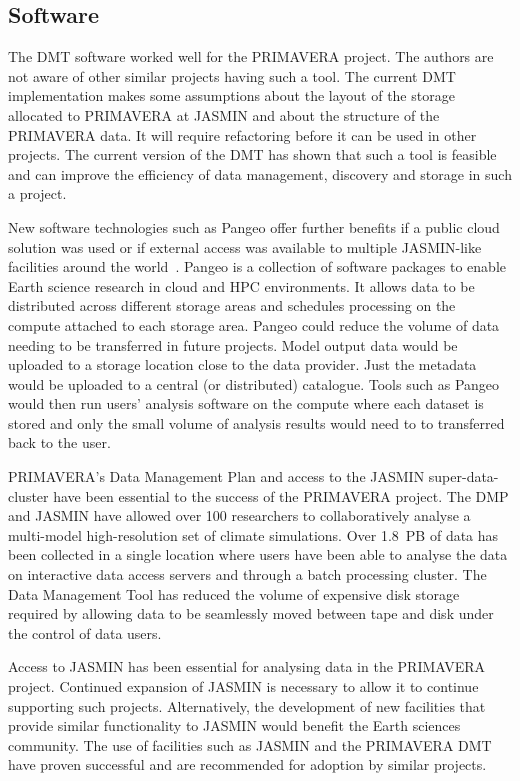 \documentclass[gmd, manuscript]{copernicus}
\begin{document}
\subsection{Software}

The DMT software worked well for the PRIMAVERA project. The authors are not aware of other similar projects having such a tool. The current DMT implementation makes some assumptions about the layout of the storage allocated to PRIMAVERA at JASMIN and about the structure of the PRIMAVERA data. It will require refactoring before it can be used in other projects. The current version of the DMT has shown that such a tool is feasible and can improve the efficiency of data management, discovery and storage in such a project.

New software technologies such as Pangeo offer further benefits if a public cloud solution was used or if external access was available to multiple JASMIN-like facilities around the world~\citep{Pangeo}. Pangeo is a collection of software packages to enable Earth science research in cloud and HPC environments. It allows data to be distributed across different storage areas and schedules processing on the compute attached to each storage area. Pangeo could reduce the volume of data needing to be transferred in future projects. Model output data would be uploaded to a storage location close to the data provider. Just the metadata would be uploaded to a central (or distributed) catalogue. Tools such as Pangeo would then run users' analysis software on the compute where each dataset is stored and only the small volume of analysis results would need to to transferred back to the user.

\conclusions  %

PRIMAVERA's Data Management Plan and access to the JASMIN super-data-cluster have been essential to the success of the PRIMAVERA project. The DMP and JASMIN have allowed over 100 researchers to collaboratively analyse a multi-model high-resolution set of climate simulations. Over 1.8~PB of data has been collected in a single location where users have been able to analyse the data on interactive data access servers and through a batch processing cluster. The Data Management Tool has reduced the volume of expensive disk storage required by allowing data to be seamlessly moved between tape and disk under the control of data users.

Access to JASMIN has been essential for analysing data in the PRIMAVERA project. Continued expansion of JASMIN is necessary to allow it to continue supporting such projects. Alternatively, the development of new facilities that provide similar functionality to JASMIN would benefit the Earth sciences community. The use of facilities such as JASMIN and the PRIMAVERA DMT have proven successful and are recommended for adoption by similar projects.
\end{document}
